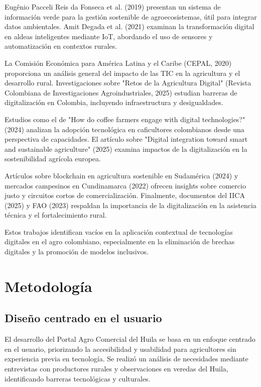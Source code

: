 Eugênio Pacceli Reis da Fonseca et al. (2019) presentan un sistema de información verde para la gestión sostenible de agroecosistemas, útil para integrar datos ambientales. Amit Degada et al. (2021) examinan la transformación digital en aldeas inteligentes mediante IoT, abordando el uso de sensores y automatización en contextos rurales.

La Comisión Económica para América Latina y el Caribe (CEPAL, 2020) proporciona un análisis general del impacto de las TIC en la agricultura y el desarrollo rural. Investigaciones sobre "Retos de la Agricultura Digital" (Revista Colombiana de Investigaciones Agroindustriales, 2025) estudian barreras de digitalización en Colombia, incluyendo infraestructura y desigualdades.

Estudios como el de "How do coffee farmers engage with digital technologies?" (2024) analizan la adopción tecnológica en caficultores colombianos desde una perspectiva de capacidades. El artículo sobre "Digital integration toward smart and sustainable agriculture" (2025) examina impactos de la digitalización en la sostenibilidad agrícola europea.

Artículos sobre blockchain en agricultura sostenible en Sudamérica (2024) y mercados campesinos en Cundinamarca (2022) ofrecen insights sobre comercio justo y circuitos cortos de comercialización. Finalmente, documentos del IICA (2025) y FAO (2023) respaldan la importancia de la digitalización en la asistencia técnica y el fortalecimiento rural.

Estos trabajos identifican vacíos en la aplicación contextual de tecnologías digitales en el agro colombiano, especialmente en la eliminación de brechas digitales y la promoción de modelos inclusivos.

\section{Metodología}

\subsection{Diseño centrado en el usuario}
El desarrollo del Portal Agro Comercial del Huila se basa en un enfoque centrado en el usuario, priorizando la accesibilidad y usabilidad para agricultores sin experiencia previa en tecnología. Se realizó un análisis de necesidades mediante entrevistas con productores rurales y observaciones en veredas del Huila, identificando barreras tecnológicas y culturales.

